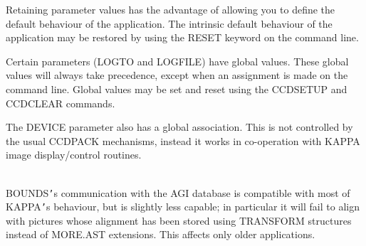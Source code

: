 \documentclass[twoside,11pt]{article}
\newcommand{\xref}[3]{#1}
\renewcommand{\_}{\texttt{\symbol{95}}}
\newcommand{\routine}[1]{{\sc #1}}
\newcommand{\sstimplementationstatus}[1]{
   \item[{Implementation Status:}] \mbox{} \\[1.3ex] #1}
\newcommand{\sstimplementationstatus}[1]{
      \item[Implementation Status:] #1
   }
\begin{document}
{{      Retaining parameter values has the advantage of allowing you to
      define the default behaviour of the application. The intrinsic
      default behaviour of the application may be restored by using the
      RESET keyword on the command line.

      Certain parameters (LOGTO and LOGFILE) have global
      values. These global values will always take precedence, except
      when an assignment is made on the command line. Global values may
      be set and reset using the CCDSETUP and CCDCLEAR commands.

      The DEVICE parameter also has a global association. This is not
      controlled by the usual CCDPACK mechanisms, instead it works in
      co-operation with \xref{KAPPA}{sun95}{} image display/control routines.
   }
   \sstimplementationstatus{
      \routine{BOUNDS}{\tt '}s communication with the AGI database is compatible with
      most of KAPPA{\tt '}s behaviour, but is slightly less capable; in
      particular it will fail to align with pictures whose alignment
      has been stored using TRANSFORM structures instead of MORE.AST
      extensions.  This affects only older applications.
   }
}
\end{document}
